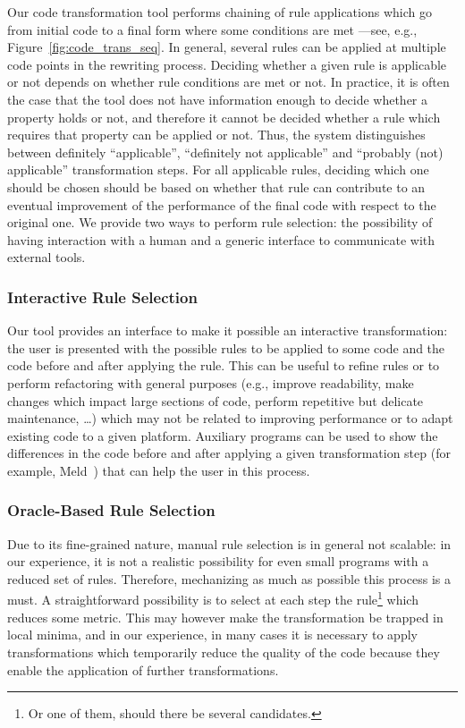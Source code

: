 \documentclass[svgnames,usenames,preprint,nocopyrightspace]{sigplanconf}
\begin{document}
Our code transformation tool performs chaining of rule applications which go from
initial code to a final form where some conditions are met ---see,
e.g., Figure~\ref{fig:code_trans_seq}.  In general, several rules can
be applied at multiple code points in the rewriting process.  Deciding whether
a given rule is applicable or not depends on whether rule conditions are met or not.  In practice, it is often the case that
the tool does not have information enough to decide whether a property
holds or not, and therefore it cannot be decided whether 
a rule which requires that property can be applied or not. Thus,
the system distinguishes between definitely ``applicable'',
``definitely not applicable'' and ``probably (not) applicable''
transformation steps.  For all applicable rules, deciding which one
should be chosen
should be based on whether that rule can 
contribute to an eventual improvement of the performance of the final code with respect to the original one. 
We provide two ways to perform rule selection: the possibility of
having interaction with a human and a generic interface to
communicate with external tools.





\subsubsection{Interactive Rule Selection}
\label{sec:interactive-selection}


Our tool provides an interface to make it possible an interactive
transformation: the user is presented with the possible rules to be
applied to some code and the code before and after applying the
rule.  This can be 
useful to refine rules or 
to perform refactoring with general purposes (e.g., improve
  readability, make changes which impact large sections of code,
  perform repetitive but delicate maintenance, \ldots) which may not be
  related to improving performance or to adapt existing code to a
  given platform.
Auxiliary programs can be used to show the differences in the code before
and after applying a given transformation step (for example,
Meld~\cite{meld}) that can help the user in this process.


\subsubsection{Oracle-Based Rule Selection}
\label{sec:oracle-selection}

Due to its fine-grained nature, manual rule selection is in general not scalable: in our experience,
it is not a realistic possibility for even small programs with a
reduced set of rules.  Therefore, mechanizing as much as possible this
process is a must.
A straightforward possibility is to select at each step the
rule\footnote{Or one of them, should there be several candidates.}
which reduces some metric.  This may however make the transformation
be trapped in local minima, and in our experience, in many cases it is
necessary to apply transformations which temporarily reduce the
quality of the code because they enable the application of further transformations.
\end{document}
